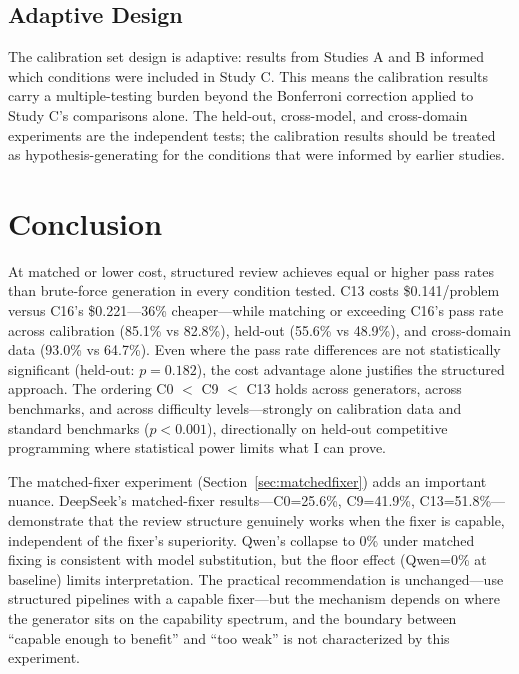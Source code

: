 \documentclass{article}
\begin{document}
\subsection{Adaptive Design}

The calibration set design is adaptive: results from Studies A and B informed which conditions were included in Study C. This means the calibration results carry a multiple-testing burden beyond the Bonferroni correction applied to Study C's comparisons alone. The held-out, cross-model, and cross-domain experiments are the independent tests; the calibration results should be treated as hypothesis-generating for the conditions that were informed by earlier studies.

\section{Conclusion}
\label{sec:conclusion}

At matched or lower cost, structured review achieves equal or higher pass rates than brute-force generation in every condition tested. C13 costs \$0.141/problem versus C16's \$0.221---36\% cheaper---while matching or exceeding C16's pass rate across calibration (85.1\% vs 82.8\%), held-out (55.6\% vs 48.9\%), and cross-domain data (93.0\% vs 64.7\%). Even where the pass rate differences are not statistically significant (held-out: $p=0.182$), the cost advantage alone justifies the structured approach. The ordering C0 $<$ C9 $<$ C13 holds across generators, across benchmarks, and across difficulty levels---strongly on calibration data and standard benchmarks ($p<0.001$), directionally on held-out competitive programming where statistical power limits what I can prove.

The matched-fixer experiment (Section~\ref{sec:matchedfixer}) adds an important nuance. DeepSeek's matched-fixer results---C0=25.6\%, C9=41.9\%, C13=51.8\%---demonstrate that the review structure genuinely works when the fixer is capable, independent of the fixer's superiority. Qwen's collapse to 0\% under matched fixing is consistent with model substitution, but the floor effect (Qwen=0\% at baseline) limits interpretation. The practical recommendation is unchanged---use structured pipelines with a capable fixer---but the mechanism depends on where the generator sits on the capability spectrum, and the boundary between ``capable enough to benefit'' and ``too weak'' is not characterized by this experiment.
\end{document}
